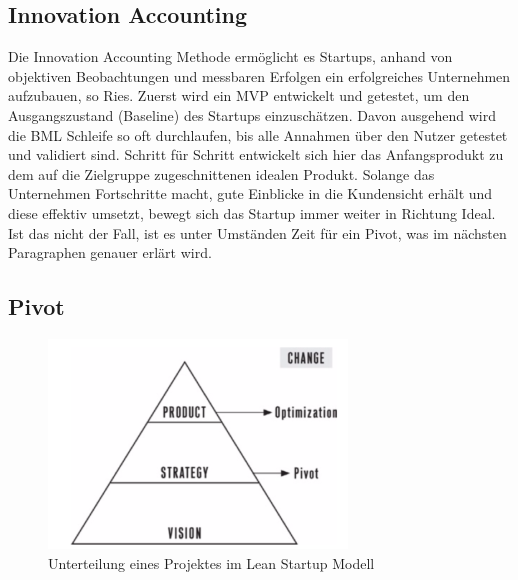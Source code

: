 
\subsection*{Innovation Accounting}
Die Innovation Accounting Methode ermöglicht es Startups, anhand von objektiven Beobachtungen und messbaren Erfolgen ein erfolgreiches Unternehmen aufzubauen, so Ries. Zuerst wird ein \ac{MVP} entwickelt und getestet, um den Ausgangszustand (Baseline) des Startups einzuschätzen. Davon ausgehend wird die \ac{BML} Schleife so oft durchlaufen, bis alle Annahmen über den Nutzer getestet und validiert sind. Schritt für Schritt entwickelt sich hier das Anfangsprodukt zu dem auf die Zielgruppe zugeschnittenen idealen Produkt. Solange das Unternehmen Fortschritte macht, gute Einblicke in die Kundensicht erhält und diese effektiv umsetzt, bewegt sich das Startup immer weiter in Richtung Ideal. Ist das nicht der Fall, ist es unter Umständen Zeit für ein Pivot, was im nächsten Paragraphen genauer erlärt wird.

\subsection*{Pivot}
\label{sec:LeanStartup_Pivot}
\begin{figure}
	\begin{center}
		\includegraphics[scale=1]{99_IMG/02_Grundlagen/visionStrategyProduct.png}
		\caption{Unterteilung eines Projektes im Lean Startup Modell}
		\label{LeanStartup_VisionStrategyProduct}
	\end{center}
\end{figure}

